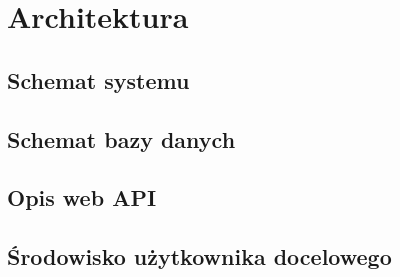 \chapter{Architektura}
\section{Schemat systemu}
\section{Schemat bazy danych}
\section{Opis web API}
\section{Środowisko użytkownika docelowego}